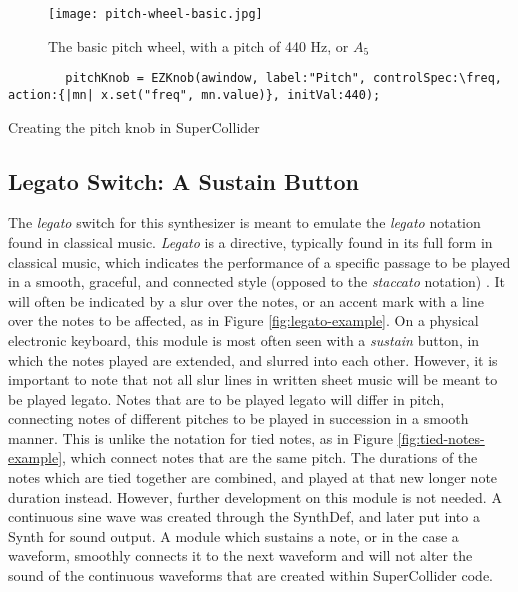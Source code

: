 \begin{figure}
  \centering
  \texttt{[image: pitch-wheel-basic.jpg]}
  \caption{The basic pitch wheel, with a pitch of 440 Hz, or $A_5$}
  \label{fig:pitch-wheel-basic}
\end{figure}

\begin{listing}
	\begin{lstlisting}
		pitchKnob = EZKnob(awindow, label:"Pitch", controlSpec:\freq, action:{|mn| x.set("freq", mn.value)}, initVal:440);
	\end{lstlisting}
	\caption{Creating the pitch knob in SuperCollider}
	\label{lst:pitch-knob-waveform}
\end{listing}



\subsection{Legato Switch: A Sustain Button} %

The \textit{legato} switch for this synthesizer is meant to emulate the \textit{legato} notation found in classical music. \textit{Legato} is a directive, typically found in its full form in classical music, which indicates the performance of a specific passage to be played in a smooth, graceful, and connected style (opposed to the \textit{staccato} notation) \cite{Winer_2018}. It will often be indicated by a slur over the notes, or an accent mark with a line over the notes to be affected, as in Figure \ref{fig:legato-example}\cite{Henle_2009}. On a physical electronic keyboard, this module is most often seen with a \textit{sustain} button, in which the notes played are extended, and slurred into each other. However, it is important to note that not all slur lines in written sheet music will be meant to be played legato. Notes that are to be played legato will differ in pitch, connecting notes of different pitches to be played in succession in a smooth manner. This is unlike the notation for tied notes, as in Figure \ref{fig:tied-notes-example}\cite{Lung_2016}, which connect notes that are the same pitch. The durations of the notes which are tied together are combined, and played at that new longer note duration instead. However, further development on this module is not needed. A continuous sine wave was created through the SynthDef, and later put into a Synth for sound output. A module which sustains a note, or in the case a waveform, smoothly connects it to the next waveform and will not alter the sound of the continuous waveforms that are created within SuperCollider code.

